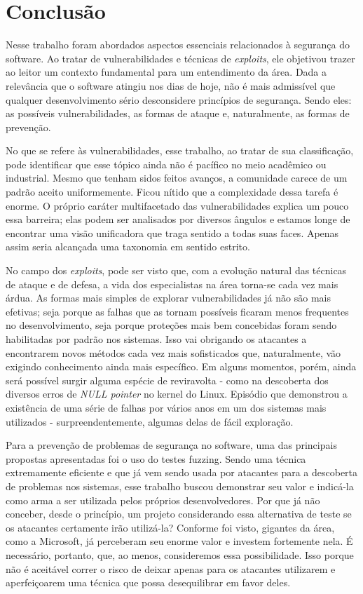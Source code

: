 
\chapter{Conclusão}
\label{chap:conclusao}
	Nesse trabalho foram abordados aspectos essenciais relacionados à segurança do software.
	Ao tratar de vulnerabilidades e técnicas de \textsl{exploits}, ele objetivou
	trazer ao leitor um contexto fundamental para um entendimento da área. Dada a relevância
	que o software atingiu nos dias de hoje, não é mais admissível que qualquer desenvolvimento
	sério desconsidere princípios de segurança. Sendo eles: as possíveis vulnerabilidades,
	as formas de ataque e, naturalmente, as formas de prevenção.


	No que se refere às vulnerabilidades, esse trabalho, ao tratar de sua classificação, pode identificar
	que esse tópico ainda não é pacífico no meio acadêmico ou industrial. Mesmo que tenham
	sidos feitos avanços, a comunidade carece de um padrão aceito uniformemente. Ficou nítido que a complexidade
	dessa tarefa é enorme. O próprio caráter multifacetado das vulnerabilidades explica um pouco essa barreira;
	elas podem ser analisados por diversos ângulos e estamos longe de encontrar uma visão unificadora
	que traga sentido a todas suas faces. Apenas assim seria alcançada uma taxonomia em sentido estrito.


	No campo dos \textsl{exploits}, pode ser visto que, com a evolução natural
	das técnicas de ataque e de defesa, a vida dos especialistas na área torna-se cada vez mais árdua.
	As formas mais simples de explorar vulnerabilidades já não são mais efetivas; seja porque as falhas
	que as tornam possíveis ficaram menos frequentes no desenvolvimento, seja porque proteções mais
	bem concebidas foram sendo habilitadas por padrão nos sistemas. Isso vai obrigando os atacantes
	a encontrarem novos métodos cada vez mais sofisticados que, naturalmente, vão exigindo conhecimento
	ainda mais específico. Em alguns momentos, porém, ainda será possível surgir alguma espécie
	de reviravolta - como na descoberta dos diversos erros de \textsl{NULL pointer} no kernel do Linux.
	Episódio que demonstrou a existência de uma série de falhas por vários anos em um dos sistemas
	mais utilizados - surpreendentemente, algumas delas de fácil exploração.


	Para a prevenção de problemas de segurança no software, uma das principais propostas apresentadas foi
	o uso do testes fuzzing. Sendo uma técnica extremamente eficiente e que já vem sendo usada
	por atacantes para a descoberta de problemas nos sistemas, esse trabalho buscou demonstrar seu valor
	e indicá-la como arma a ser utilizada pelos próprios desenvolvedores. Por que já não conceber, desde
	o princípio, um projeto considerando essa alternativa de teste se os atacantes certamente irão utilizá-la?
	Conforme foi visto, gigantes da área, como a Microsoft, já perceberam seu enorme valor e investem
	fortemente nela. É necessário, portanto, que, ao menos, consideremos essa possibilidade. Isso
	porque não é aceitável correr o risco de deixar apenas para os atacantes utilizarem e aperfeiçoarem
	uma técnica que possa desequilibrar em favor deles.

